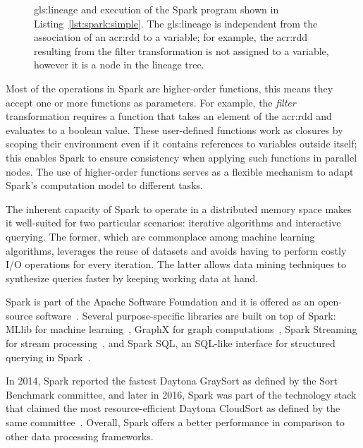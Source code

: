 \begin{figure}[t]
\caption[\Gls{gls:lineage} Tree and Execution of a Spark Program]{\Gls{gls:lineage} and execution of the Spark program shown in Listing~\ref{lst:spark:simple}. The \gls{gls:lineage} is independent from the association of an \acrshort{acr:rdd} to a variable; for example, the \acrshort{acr:rdd} resulting from the filter transformation is not assigned to a variable, however it is a node in the lineage tree.}
\end{figure}

Most of the operations in Spark are higher-order functions, this means they accept one or more functions as parameters. For example, the \textit{filter} transformation requires a function that takes an element of the \acrshort{acr:rdd} and evaluates to a boolean value. These user-defined functions work as closures by scoping their environment even if it contains references to variables outside itself; this enables Spark to ensure consistency when applying such functions in parallel nodes. The use of higher-order functions serves as a flexible mechanism to adapt Spark's computation model to different tasks.

The inherent capacity of Spark to operate in a distributed memory space makes it well-suited for two particular scenarios: iterative algorithms and interactive querying. The former, which are commonplace among machine learning algorithms, leverages the reuse of datasets and avoids having to perform costly I/O operations for every iteration. The latter allows data mining techniques to synthesize queries faster by keeping working data at hand.

Spark is part of the Apache Software Foundation and it is offered as an open-source software~\cite{WebApache2017,WebSpark2017}. Several purpose-specific libraries are built on top of Spark: MLlib for machine learning~\cite{Meng2016}, GraphX for graph computations~\cite{Xin2013}, Spark Streaming for stream processing~\cite{Zaharia2013}, and Spark SQL, an \mbox{SQL-like} interface for structured querying in Spark~\cite{Armbrust2015a}.

In 2014, Spark reported the fastest Daytona GraySort as defined by the Sort Benchmark committee, and later in 2016, Spark was part of the technology stack that claimed the most resource-efficient Daytona CloudSort as defined by the same committee~\cite{WebSortBenchmark2017,Xin2014,Wang}. Overall, Spark offers a better performance in comparison to other data processing frameworks.


